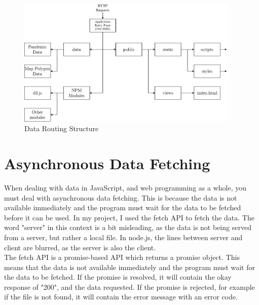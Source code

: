 \documentclass{report}
\begin{document}
\begin{center}
    \begin{figure}[h]
        \centering
        \includegraphics[width=0.95\textwidth]{Images/router_scheme.drawio.png}
        \caption{Data Routing Structure}
        \label{fig:nodejs_structure}
    \end{figure}
\end{center}

\section{Asynchronous Data Fetching}
When dealing with data in JavaScript, and web programming as a whole, you must deal with asynchronous data fetching. This is because the data is not available immediately and the program must wait for the data to be fetched before it can be used. In my project, I used the fetch API to fetch the data. The word "server" in this context is a bit misleading, as the data is not being served from a server, but rather a local file. In node.js, the lines between server and client are blurred, as the server is also the client.\\

The fetch API is a promise-based API which returns a promise object. This means that the data is not available immediately and the program must wait for the data to be fetched. If the promise is resolved, it will contain the okay response of "200", and the data requested. If the promise is rejected, for example if the file is not found, it will contain the error message with an error code.\\ 
\end{document}
